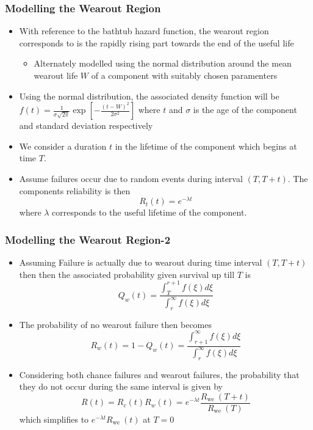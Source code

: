 \documentclass{beamer}  %
\begin{document}
\begin{frame}
\frametitle{Modelling the Wearout Region}

\begin{itemize}
\item With reference to the bathtub hazard function, the wearout region corresponds to is the rapidly rising part towards the end of the useful life 
\begin{itemize}
\item Alternately modelled using the normal distribution around the mean wearout life $W$ of a component with suitably chosen paramenters
\end{itemize}

\item Using the normal distribution, the associated density function will be
$f(t)=\frac{1}{\sigma \sqrt{2 \pi}} \exp \left[-\frac{(t-W)^{2}}{2 \sigma^{2}}\right]$
where $t$ and $\sigma$ is the age of the component and standard deviation respectively

\item We consider a duration $t$ in the lifetime of the component which begins at time $T$. 

\item Assume failures occur due to random events during interval $(T,T+t)$. The components reliability is then 
$$ R_{t}(t)=e^{-\lambda t}$$ where $\lambda$ corresponds to the useful lifetime of the component.


\end{itemize}


\end{frame}


\begin{frame}
\frametitle{Modelling the Wearout Region-2}

\begin{itemize}
\item Assuming Failure is actually due to wearout during time interval $(T,T+t)$ then then the associated probability given survival up till $T$ is
$$Q_{w}(t)=\frac{\int_{T}^{r+1} f(\xi) d \xi}{\int_{r}^{\infty} f(\xi) d \xi}$$ 

\item The probability of no wearout failure then becomes
$$R_{w}(t)=1-Q_{w}(t)=\frac{\int_{r+1}^{\infty} f(\xi) d \xi}{\int_{r}^{\infty} f(\xi) d \xi}$$

\item Considering both chance failures and wearout failures, the probability that they do not occur during the same interval is given by
$$R(t)=R_{c}(t) R_{w}(t)=e^{-\lambda t} \frac{R_{\text {we }}(T+t)}{R_{\text {we }}(T)}$$ which simplifies to $e^{-\lambda t}R_{\text {we }}(t)$ at $T=0$
\end{itemize}


\end{frame}
\end{document}
